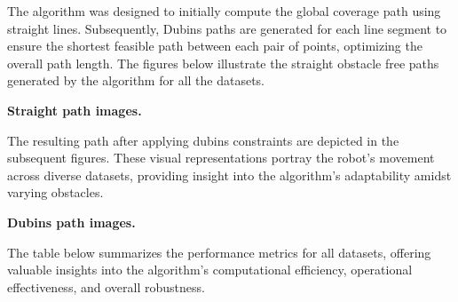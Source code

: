 \vspace*{6mm} 

The algorithm was designed to initially compute the global coverage path using straight lines. Subsequently, Dubins paths are generated for each line segment to ensure the shortest feasible path between each pair of points, optimizing the overall path length. The figures below illustrate the straight obstacle free paths generated by the algorithm for all the datasets.

\textbf{Straight path images.}

\vspace*{6mm}

The resulting path after applying dubins constraints are depicted in the subsequent figures. These visual representations portray the robot's movement across diverse datasets, providing insight into the algorithm's adaptability amidst varying obstacles. 


\textbf{Dubins path images.}

\vspace*{6mm}  

The table below summarizes the performance metrics for all datasets, offering valuable insights into the algorithm's computational efficiency, operational effectiveness, and overall robustness.

